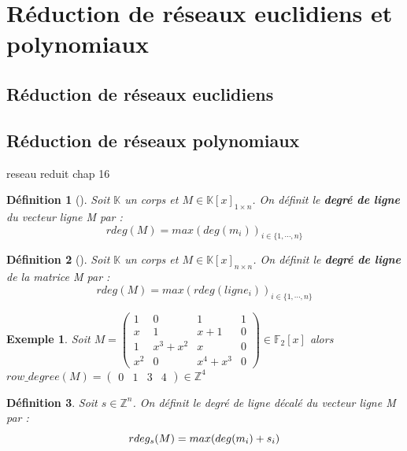 \documentclass[a4paper,12pt]{report}  %
\theoremstyle{definitionstyle}
\newtheorem{definition}{Définition}[chapter] %
\theoremstyle{examplestyle}
\newtheorem{example}{Exemple}[chapter] %
\theoremstyle{remarkstyle}
\begin{document}
	
	\section{Réduction de réseaux euclidiens et polynomiaux}
	
	\subsection{Réduction de réseaux euclidiens}
	
	\subsection{Réduction de réseaux polynomiaux}
	
	reseau reduit chap 16
	
	\begin{definition}[\cite{clef_unique_0}]
		Soit $\mathbb{K}$ un corps et $M \in \mathbb{K}[x]_{1 \times n}$. On définit le \textbf{degré de ligne} du vecteur ligne M par : 
		$$rdeg(M)=max(deg(m_i))_{i\in\{1, \cdots, n\}}$$
	\end{definition}
	
	\begin{definition}[\cite{clef_unique_0}]
		Soit $\mathbb{K}$ un corps et $M \in \mathbb{K}[x]_{n \times n}$. On définit le \textbf{degré de ligne} de la matrice M par :
		$$rdeg(M)=max(rdeg(ligne_i))_{i\in\{1, \cdots, n\}}$$
	\end{definition}
	
	\begin{example}
		Soit $M =
		\left(\begin{array}{rrrr}
			1 & 0 & 1 & 1 \\
			x & 1 & x + 1 & 0 \\
			1 & x^{3} + x^{2} & x & 0 \\
			x^{2} & 0 & x^{4} + x^{3} & 0
		\end{array}\right) \in \mathbb{F}_2[x]
		$
		alors $row\_degree(M)=\left(\begin{array}{rrrr}
			0 & 1 & 3 & 4
		\end{array}\right)\in \mathbb{Z}^4$
		
	\end{example}
	
	\begin{definition}
		Soit $s \in \mathbb{Z}^n$. On définit le degré de ligne décalé du vecteur ligne M par :
		$$rdeg_s(M)=max(deg(m_i)+s_i\\)$$
	\end{definition}
\end{document}
